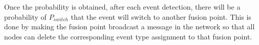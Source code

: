 Once the probability is obtained, after each event detection, there will be a probability of \(P_{switch}\) that the event will switch to another fusion point. This is done by making the fusion point broadcast a message in the network so that all nodes can delete the corresponding event type assignment to that fusion point.